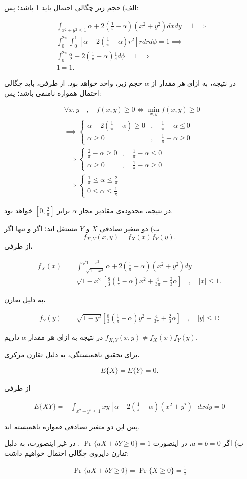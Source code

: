 \documentclass[10pt,letterpaper]{report}
\newcommand{\eqn}[1]{
\[\begin{split}
#1
\end{split}\]
}
\begin{document}
الف) حجم زیر چگالی احتمال باید 1 باشد؛ پس:
\eqn{
&\int_{x^2+y^2\le 1}\alpha+2(\frac{1}{\pi}-\alpha)(x^2+y^2)dxdy=1
\implies
\\&
\int_0^{2\pi}\int_0^1\left[\alpha+2(\frac{1}{\pi}-\alpha)r^2\right]rdrd\phi=1
\implies
\\&
\int_0^{2\pi}\frac{\alpha}{2}+2(\frac{1}{\pi}-\alpha)\frac{1}{4}d\phi=1
\implies
\\&
1=1.
}
در نتیجه، به ازای هر مقدار از $\alpha$ حجم زیر، واحد خواهد بود. از طرفی، باید چگالی احتمال همواره نامنفی باشد؛ پس:
\eqn{
&
\forall x,y\quad,\quad f(x,y)\ge 0\iff \min_{x,y}f(x,y)\ge 0
\\&\implies 
\begin{cases}
\alpha+2(\frac{1}{\pi}-\alpha)\ge 0&,\quad \frac{1}{\pi}-\alpha\le 0\\
\alpha\ge 0&,\quad \frac{1}{\pi}-\alpha\ge 0
\end{cases}
\\&\implies 
\begin{cases}
\frac{2}{\pi}-\alpha\ge 0&,\quad \frac{1}{\pi}-\alpha\le 0\\
\alpha\ge 0&,\quad \frac{1}{\pi}-\alpha\ge 0
\end{cases}
\\&\implies 
\begin{cases}
\frac{1}{\pi}\le \alpha\le \frac{2}{\pi}\\
0\le \alpha\le \frac{1}{\pi}
\end{cases}
}

در نتیجه، محدوده‌ی مقادیر مجاز 
$
\alpha
$
برابر
$
[0,\frac{2}{\pi}]
$
خواهد بود.

ب) دو متغیر تصادفی 
$
X
$
و
$
Y
$
مستقل اند؛ اگر و تنها اگر
$$
f_{X,Y}(x,y)=f_{X}(x)f_{Y}(y).
$$
از طرفی،
\eqn{
f_X(x)&=\int_{-\sqrt{1-x^2}}^{\sqrt{1-x^2}} \alpha+2(\frac{1}{\pi}-\alpha)(x^2+y^2)dy
\\&=
\sqrt{1-x^2}\left[
\frac{8}{3}\left(\frac{1}{\pi}-\alpha\right)x^2+\frac{4}{3\pi}+\frac{2}{3}\alpha
\right]
\quad,\quad |x|\le 1.
}
به دلیل تقارن،
\eqn{
f_Y(y)&=
\sqrt{1-y^2}\left[
\frac{8}{3}\left(\frac{1}{\pi}-\alpha\right)y^2+\frac{4}{3\pi}+\frac{2}{3}\alpha
\right]
\quad,\quad |y|\le 1؛
}
در نتیجه به ازای هر مقدار $\alpha$ داریم
$
f_{X,Y}(x,y)\ne f_X(x)f_Y(y)
$.

برای تحقیق ناهمبستگی، به دلیل تقارن مرکزی،
\eqn{
E\{X\}=E\{Y\}=0.
}
از طرفی
\eqn{
E\{XY\}=&
\int_{x^2+y^2\le 1}xy[\alpha+2(\frac{1}{\pi}-\alpha)(x^2+y^2)]dxdy
=
0
}
پس این دو متغیر تصادفی همواره ناهمبسته اند.

پ) اگر $a=b=0$، در اینصورت
$
\Pr\{aX+bY\ge 0\}=1
$
. در غیر اینصورت، به دلیل تقارن دایروی چگالی احتمال خواهیم داشت:
\eqn{
\Pr\{aX+bY\ge 0\}=\Pr\{X\ge 0\}=\frac{1}{2}
}
\end{document}
